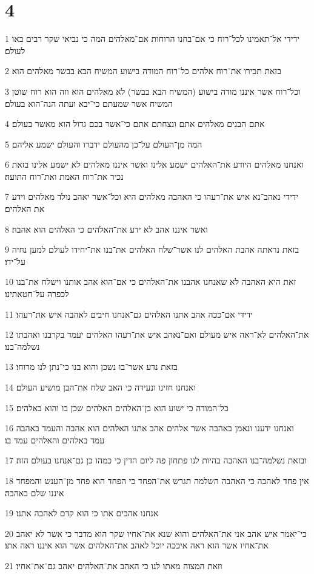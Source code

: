 \chapter{4}

\par 1 ידידי אל־תאמינו לכל־רוח כי אם־בחנו הרוחות אם־מאלהים המה כי נביאי שקר רבים באו לעולם׃
\par 2 בזאת תכירו את־רוח אלהים כל־רוח המודה בישוע המשיח הבא בבשר מאלהים הוא׃
\par 3 וכל־רוח אשר איננו מודה בישוע (המשיח הבא בבשר) לא מאלהים הוא וזה הוא רוח שוטן המשיח אשר שמעתם כי־יבא ועתה הנה־הוא בעולם׃
\par 4 אתם הבנים מאלהים אתם ונצחתם אתם כי־אשר בכם גדול הוא מאשר בעולם׃
\par 5 המה מן־העולם על־כן מהעולם ידברו והעולם ישמע אליהם׃
\par 6 ואנחנו מאלהים היודע את־האלהים ישמע אלינו ואשר איננו מאלהים לא ישמע אלינו בזאת נכיר את־רוח האמת ואת־רוח התועה׃
\par 7 ידידי נאהב־נא איש את־רעהו כי האהבה מאלהים היא וכל־אשר יאהב נולד מאלהים וידע את האלהים׃
\par 8 ואשר איננו אהב לא ידע את־האלהים כי האלהים הוא אהבה׃
\par 9 בזאת נראתה אהבת האלהים לנו אשר־שלח האלהים את־בנו את־יחידו לעולם למען נחיה על־ידו׃
\par 10 זאת היא האהבה לא שאנחנו אהבנו את־האלהים כי אם־הוא אהב אותנו וישלח את־בנו לכפרה על־חטאתינו׃
\par 11 ידידי אם־ככה אהב אתנו האלהים גם־אנחנו חיבים לאהבה איש את־רעהו׃
\par 12 את־האלהים לא־ראה איש מעולם ואם־נאהב איש את־רעהו האלהים יעמד בקרבנו ואהבתו נשלמה־בנו׃
\par 13 בזאת נדע אשר־בו נשכן והוא בנו כי־נתן לנו מרוחו׃
\par 14 ואנחנו חזינו ונעידה כי האב שלח את־הבן מושיע העולם׃
\par 15 כל־המודה כי ישוע הוא בן־האלהים האלהים שכן בו והוא באלהים׃
\par 16 ואנחנו ידענו ונאמן באהבה אשר אלהים אהב אתנו האלהים הוא אהבה והעמד באהבה עמד באלהים והאלהים עמד בו׃
\par 17 ובזאת נשלמה־בנו האהבה בהיות לנו פתחון פה ליום הדין כי כמהו כן גם־אנחנו בעולם הזה׃
\par 18 אין פחד לאהבה כי האהבה השלמה תגרש את־הפחד כי הפחד הוא פחד מן־הענש והמפחד איננו שלם באהבה׃
\par 19 אנחנו אהבים אתו כי הוא קדם לאהבה אתנו׃
\par 20 כי־יאמר איש אהב אני את־האלהים והוא שנא את־אחיו שקר הוא מדבר כי אשר לא יאהב את־אחיו אשר הוא ראה איככה יוכל לאהב את־האלהים אשר הוא איננו ראה אתו׃
\par 21 וזאת המצוה מאתו לנו כי האהב את־האלהים יאהב גם־את־אחיו׃

